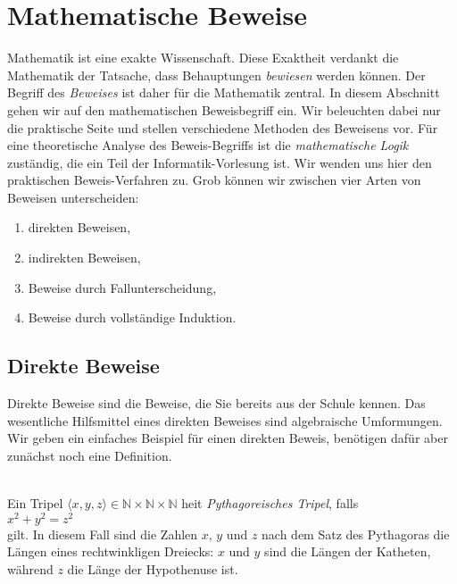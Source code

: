 \chapter{Mathematische Beweise}
Mathematik ist eine exakte Wissenschaft. Diese Exaktheit verdankt die Mathematik der
Tatsache, dass Behauptungen \emph{bewiesen} werden k\"{o}nnen.  Der Begriff des \emph{Beweises} 
ist daher f\"{u}r die Mathematik zentral.  
In diesem Abschnitt gehen wir auf den mathematischen Beweisbegriff ein.  Wir beleuchten dabei nur die
praktische Seite und stellen verschiedene Methoden des Beweisens vor.  F\"{u}r eine theoretische Analyse des
Beweis-Begriffs ist die \emph{mathematische Logik} zust\"{a}ndig, die ein Teil der Informatik-Vorlesung ist.
Wir wenden uns hier den praktischen Beweis-Verfahren zu.
Grob k\"{o}nnen wir zwischen vier Arten von Beweisen unterscheiden:
\begin{enumerate}
\item direkten Beweisen,
\item indirekten Beweisen,
\item Beweise durch Fallunterscheidung, 
\item Beweise durch vollst\"{a}ndige Induktion.
\end{enumerate}

\section{Direkte Beweise}
Direkte Beweise sind die Beweise, die Sie bereits aus der Schule kennen.  Das wesentliche Hilfsmittel eines direkten Beweises
sind algebraische Umformungen.  Wir geben ein einfaches Beispiel f\"{u}r einen
direkten Beweis, ben\"{o}tigen daf\"{u}r aber zun\"{a}chst noch eine Definition.


\begin{Definition} \hspace*{\fill} \\
Ein Tripel $\langle x, y, z \rangle \in \mathbb{N}\!\times\!\mathbb{N}\!\times\!\mathbb{N}$ hei\3t
\emph{Pythagoreisches Tripel}, falls
\\[0.2cm]
\hspace*{1.3cm}
$x^2 + y^2 = z^2$
\\[0.2cm]
gilt.  In diesem Fall sind die Zahlen $x$, $y$ und $z$ nach dem Satz des Pythagoras die L\"{a}ngen eines
rechtwinkligen Dreiecks:  $x$ und $y$ sind die L\"{a}ngen der Katheten, w\"{a}hrend $z$ die L\"{a}nge der Hypothenuse
ist.
\end{Definition}

